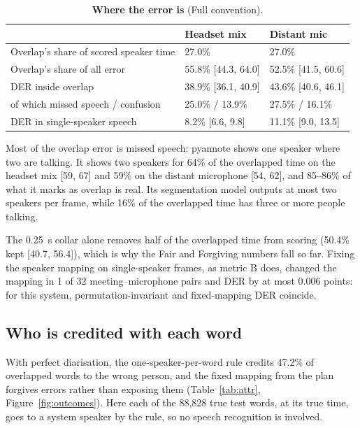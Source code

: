 \documentclass[11pt,a4paper]{article}
\let\oldsubsection\subsection
\renewcommand{\subsection}{\FloatBarrier\oldsubsection}
\begin{document}
\begin{table}[htbp]
\centering
\caption{\textbf{Where the error is} (Full convention).}
\label{tab:where}
\small
\begin{tabular}{@{}lll@{}}
\toprule
 & Headset mix & Distant mic \\
\midrule
Overlap's share of scored speaker time & 27.0\% & 27.0\% \\
Overlap's share of all error & 55.8\% [44.3, 64.0] & 52.5\% [41.5, 60.6] \\
DER inside overlap & 38.9\% [36.1, 40.9] & 43.6\% [40.6, 46.1] \\
\quad of which missed speech / confusion & 25.0\% / 13.9\% & 27.5\% / 16.1\% \\
DER in single-speaker speech & 8.2\% [6.6, 9.8] & 11.1\% [9.0, 13.5] \\
\bottomrule
\end{tabular}
\end{table}

Most of the overlap error is missed speech: pyannote shows one speaker where two are talking. It shows two speakers for 64\% of the overlapped time on the headset mix [59, 67] and 59\% on the distant microphone [54, 62], and 85--86\% of what it marks as overlap is real. Its segmentation model outputs at most two speakers per frame, while 16\% of the overlapped time has three or more people talking.

The 0.25~s collar alone removes half of the overlapped time from scoring (50.4\% kept [40.7, 56.4]), which is why the Fair and Forgiving numbers fall so far. Fixing the speaker mapping on single-speaker frames, as metric B does, changed the mapping in 1 of 32 meeting--microphone pairs and DER by at most 0.006 points: for this system, permutation-invariant and fixed-mapping DER coincide.

\subsection{Who is credited with each word}\label{sec:attr}

With perfect diarisation, the one-speaker-per-word rule credits 47.2\% of overlapped words to the wrong person, and the fixed mapping from the plan forgives errors rather than exposing them (Table~\ref{tab:attr}, Figure~\ref{fig:outcomes}). Here each of the 88,828 true test words, at its true time, goes to a system speaker by the rule, so no speech recognition is involved.
\end{document}
